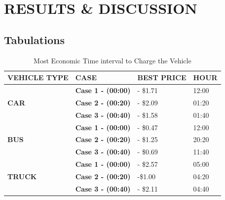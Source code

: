 
	\chapter{RESULTS \& DISCUSSION}
	\label{chap:results}
	
	\section{Tabulations}
	
		\begin{table}[]
			\caption{Most Economic Time interval to Charge the Vehicle}
			\centering
		\begin{tabular}{|l|l|l|l|}
			\hline
			\textbf{VEHICLE TYPE}           & \textbf{CASE}         & \textbf{BEST PRICE} & \textbf{HOUR} \\ \hline
			\multirow{3}{*}{\textbf{CAR}}   & \textbf{Case 1 - (00:00)} & - \$1.71            & 12:00         \\ \cline{2-4} 
			& \textbf{Case 2 - (00:20)} & - \$2.09            & 01:20         \\ \cline{2-4} 
			& \textbf{Case 3 - (00:40)} & - \$1.58            & 01:40         \\ \hline
			\multirow{3}{*}{\textbf{BUS}}   & \textbf{Case 1 - (00:00)} & - \$0.47            & 12:00         \\ \cline{2-4} 
			& \textbf{Case 2 - (00:20)} & - \$1.25            & 20:20         \\ \cline{2-4} 
			& \textbf{Case 3 - (00:40)} & - \$0.69            & 11:40         \\ \hline
			\multirow{3}{*}{\textbf{TRUCK}} & \textbf{Case 1 - (00:00)} & - \$2.57            & 05:00         \\ \cline{2-4} 
			& \textbf{Case 2 - (00:20)} & -\$1.00             & 04:20         \\ \cline{2-4} 
			& \textbf{Case 3 - (00:40)} & - \$2.11            & 04:40         \\ \hline
		\end{tabular}
	\end{table}
	
